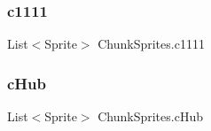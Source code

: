 \subsubsection{\texorpdfstring{c1111}{c1111}}
{\footnotesize\ttfamily List$<$Sprite$>$ Chunk\+Sprites.\+c1111}

\mbox{\label{class_chunk_sprites_ad3790f456c356fe27f3da510f399f6a9}} 
\subsubsection{\texorpdfstring{cHub}{cHub}}
{\footnotesize\ttfamily List$<$Sprite$>$ Chunk\+Sprites.\+c\+Hub}


